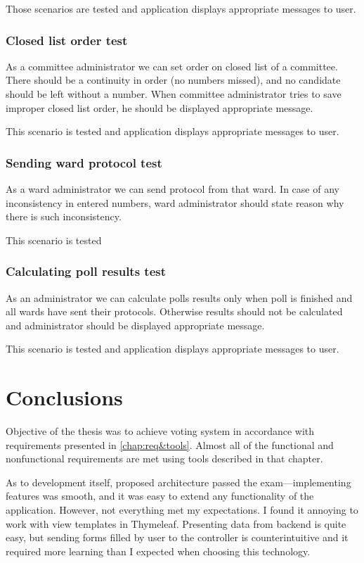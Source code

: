 \documentclass[a4paper,twoside,12pt]{book}
\begin{document}
      Those scenarios are tested and application displays appropriate messages to user.

    \subsection{Closed list order test}
      As a committee administrator we can set order on closed list of a committee.
      There should be a continuity in order (no numbers missed), and no candidate should be left without a number.
      When committee administrator tries to save improper closed list order, he should be displayed appropriate message.

      This scenario is tested and application displays appropriate messages to user.

    \subsection{Sending ward protocol test}
      As a ward administrator we can send protocol from that ward.
      In case of any inconsistency in entered numbers, ward administrator should state reason why there is such inconsistency.

      This scenario is tested %

    \subsection{Calculating poll results test}
      As an administrator we can calculate polls results only when poll is finished and all wards have sent their protocols.
      Otherwise results should not be calculated and administrator should be displayed appropriate message.
      
      This scenario is tested and application displays appropriate messages to user.

\chapter{Conclusions}
  Objective of the thesis was to achieve voting system in accordance with requirements presented in \autoref{chap:req&tools}.
  Almost all of the functional and nonfunctional requirements are met using tools described in that chapter.%

  As to development itself, proposed architecture passed the exam---implementing features was smooth, and it was easy to extend any functionality of the application.
  However, not everything met my expectations. I found it annoying to work with view templates in Thymeleaf. 
  Presenting data from backend is quite easy, but sending forms filled by user to the controller is counterintuitive and it required more learning than I expected when choosing this technology.
\end{document}
